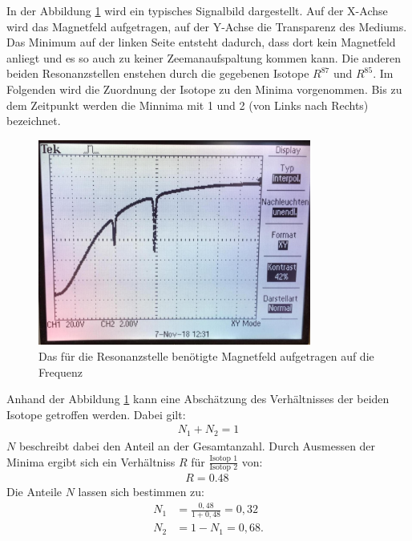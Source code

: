 In der Abbildung \ref{fig:bild} wird ein typisches Signalbild dargestellt.
Auf der X-Achse wird das Magnetfeld aufgetragen, auf der Y-Achse die Transparenz des Mediums.
Das Minimum auf der linken Seite entsteht dadurch, dass dort kein Magnetfeld anliegt und es so auch zu keiner Zeemanaufspaltung kommen kann.
Die anderen beiden Resonanzstellen enstehen durch die gegebenen Isotope $R^{87}$ und $R^{85}$.
Im Folgenden wird die Zuordnung der Isotope zu den Minima vorgenommen.
Bis zu dem Zeitpunkt werden die Minnima mit 1 und 2 (von Links nach Rechts) bezeichnet.
\begin{figure}[h!]
  \centering
  \includegraphics[width=0.8\textwidth]{bild.jpeg}
  \caption{Das für die Resonanzstelle benötigte Magnetfeld aufgetragen auf die Frequenz}
  \label{fig:bild}
\end{figure}
Anhand der Abbildung \ref{fig:bild} kann eine Abschätzung des Verhältnisses der beiden Isotope getroffen werden.
Dabei gilt:
\begin{align*}
  N_1+N_2 = 1
\end{align*}
$N$ beschreibt dabei den Anteil an der Gesamtanzahl.
Durch Ausmessen der Minima ergibt sich ein Verhältniss $R$ für $\frac{\text{Isotop 1}}{\text{Isotop 2}}$ von:
\begin{align*}
  R=\SI{0.48}{}
\end{align*}
Die Anteile $N$ lassen sich bestimmen zu:
\begin{align*}
  N_1&=\frac{0,48}{1+0,48}=0,32\\
  N_2&=1-N_1=0,68.
\end{align*}


